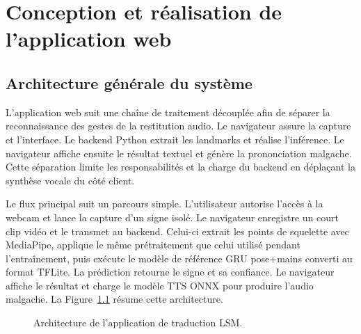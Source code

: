 \chapter{Conception et réalisation de l'application web}

\section{Architecture générale du système}

L'application web suit une chaîne de traitement découplée afin de séparer la reconnaissance des gestes de la restitution audio. Le navigateur assure la capture et l'interface. Le backend Python extrait les landmarks et réalise l'inférence. Le navigateur affiche ensuite le résultat textuel et génère la prononciation malgache. Cette séparation limite les responsabilités et la charge du backend en déplaçant la synthèse vocale du côté client.

Le flux principal suit un parcours simple. L'utilisateur autorise l'accès à la webcam et lance la capture d'un signe isolé. Le navigateur enregistre un court clip vidéo et le transmet au backend. Celui-ci extrait les points de squelette avec MediaPipe, applique le même prétraitement que celui utilisé pendant l'entraînement, puis exécute le modèle de référence GRU pose+mains converti au format TFLite. La prédiction retourne le signe et sa confiance. Le navigateur affiche le résultat et charge le modèle TTS ONNX pour produire l'audio malgache. La Figure~\ref{fig:architecture-systeme} résume cette architecture.

\begin{figure}[ht]
\centering
{}
\caption{Architecture de l'application de traduction LSM.}
\label{fig:architecture-systeme}
\end{figure}

